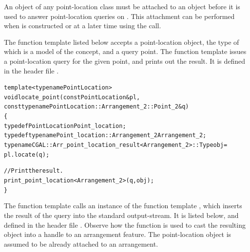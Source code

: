An object  of any point-location class must be attached to an
 object  before it is used to answer
point-location queries on . This attachment can be performed
when  is constructed or at a later time using the
 call.

The function template listed below accepts a point-location object,
the type of which is a model of the 
concept, and a query point. The function template issues a
point-location query for the given point, and prints out the result.
It is defined in the header file .

\label{lst:pl}
\begin{alltt}
template <typename PointLocation>
void locate_point(const PointLocation& pl,
                  const typename PointLocation::Arrangement_2::Point_2& q)
\{
  typedef PointLocation                                 Point_location;
  typedef typename Point_location::Arrangement_2        Arrangement_2;
  typename CGAL::Arr_point_location_result<Arrangement_2>::Type obj =
    pl.locate(q);

  // Print the result.
  print_point_location<Arrangement_2>(q, obj);
\}
\end{alltt}

The function template  calls an instance of the
function template , which inserts the
result of the query into the standard output-stream. It is listed
below, and defined in the header file .
Observe how the function  is used to cast the
resulting object into a handle to an arrangement feature. The
point-location object  is assumed to be already attached
to an arrangement.

